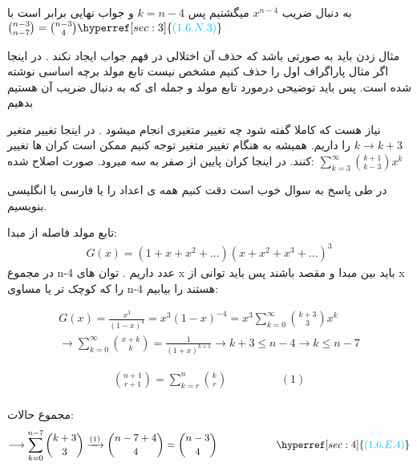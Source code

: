 \documentclass[11pt,largemargins]{h2wp}
\begin{document}
      به دنبال ضریب
      $ x ^ {n-4 } $
      میگشتیم پس 
      $ k = n-4 $
      و جواب نهایی برابر است با
      $\binom{n-3}{n-7} = \binom{n-3}{4} \\ \\ \hyperref[sec:3]{\textcolor{capri}{(1.6.N.3)}} \\   $
  
  
      
\notes

\Enote
  مثال زدن باید به صورتی باشد که حذف آن اختلالی در فهم جواب ایجاد نکند . در اینجا اگر مثال پاراگراف اول را حذف کنیم مشخص نیست تابع مولد برچه اساسی نوشته شده است. پس باید توضیحی درمورد تابع مولد و جمله ای که به دنبال ضریب آن هستیم بدهیم \label{sec:1} 
		
\Enote
     نیاز هست که کاملا گفته شود چه تغییر متغیری انجام میشود . در اینجا تغییر متغیر $ k \rightarrow {k+3} $   را داریم.  همیشه به هنگام تغییر متغیر توجه کنیم ممکن است کران ها تغییر کنند. در اینجا کران پایین از صفر به سه میرود. \label{sec:2} 
	 صورت اصلاح شده:
	 $ \sum_{k=3}^{\infty}\binom{k+1}{k-3} x^k $
	
\Nnote		
	  در طی پاسخ به سوال خوب است دقت کنیم همه ی اعداد را یا فارسی یا انگلیسی 
	  بنویسیم. \label{sec:3} 
	  
	  
\solution
  تابع مولد فاصله از مبدا:
   \begin{align*}
   G(x)=(1+x+x^2+...)(x+x^2+x^3+...)^3
   \end{align*}
   در مجموع n-4 عدد داریم . توان های x باید بین مبدا و مقصد باشند پس باید توانی از x را که کوچک تر یا مساوی n-4 هستند را بیابیم:
   
   \begin{align*}
   G(x)= \frac{x^3}{(1-x)^4} = x^3 (1-x)^{-4} = x^3 \sum_{k=0}^{\infty}\binom{k+3}{3} x^k \\ 
   \longrightarrow \sum_{k=0}^{\infty}\binom{x+k}{k} = \frac{1}{(1+x)^{k+1}} 
   \longrightarrow k+3 \le n-4 \rightarrow k \le n-7
   \end{align*}
   
   \begin{align*}
     \binom{n+1}{r+1} = \sum_{k=r}^{n} \binom{k}{r} \hspace{2cm} (1) \\
  \end{align*}
  
   مجموع حالات: 
   \begin{align*}
   \longrightarrow \sum_{k=0}^{n-7}\binom{k+3}{3} \xrightarrow{(1)}  \binom{n-7+4}{4} = \binom{n-3}{4}   \hspace{2cm} 
    { \hyperref[sec:4]{\textcolor{capri}{(1.6.E.4)}}}
   \end{align*}
   
\end{document}
